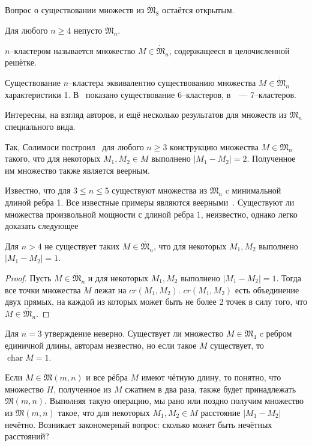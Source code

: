 Вопрос о существовании множеств из $\dot{\mathfrak{M}}_8$
остаётся открытым.

\begin{hypothesis}
	\label{hypot:general_position_nonempty}
	Для любого $n\geq 4$ непусто $\dot{\mathfrak{M}}_n$.
\end{hypothesis}


\begin{definition}
	\cite{noll1989nclusters,kurz2013constructing}
	$n$--кластером называется множество $M\in\dot{\mathfrak{M}}_n$,
	содержащееся в целочисленной решётке.
\end{definition}
Существование $n$--кластера эквивалентно существованию множества $M\in\dot{\mathfrak{M}}_n$
характеристики 1.
В~\cite{noll1989nclusters} показано существование 6--кластеров,
в~\cite{kurz2013constructing}~--- 7--кластеров.


Интересны, на взгляд авторов, и ещё несколько результатов для множеств из $\mathfrak{M}_n$ специального вида.

Так, Солимоси построил~\cite{solymosi2003note} для любого $n\geq 3$ конструкцию множества $M\in\mathfrak{M}_n$
такого, что для некоторых $M_1, M_2 \in M$ выполнено $|M_1 - M_2| = 2$.
Полученное им множество также является веерным.

Известно, что для $3\leq n \leq 5$ существуют множества из $\mathfrak{M}_n$
c минимальной длиной ребра 1.
Все известные примеры являются веерными~\cite{harborth1993upper}.
Существуют ли множества произвольной мощности с длиной ребра 1,
неизвестно, однако легко доказать следующее
\begin{proposition}
	Для $n > 4$ не существует таких $M\in\overline{\mathfrak{M}}_n$,
	что для некоторых $M_1, M_2$ выполнено $|M_1 - M_2| = 1$.
\end{proposition}
\begin{proof}
	Пусть $M\in\overline{\mathfrak{M}}_n$ и для некоторых $M_1, M_2$ выполнено $|M_1 - M_2| = 1$.
	Тогда все точки множества $M$ лежат на $cr(M_1,M_2)$.
	$cr(M_1,M_2)$ есть объединение двух прямых, на каждой из которых может быть не более 2 точек в силу того, что
	$M\in\overline{\mathfrak{M}}_n$.
\end{proof}
Для $n=3$ утверждение неверно.
Существует ли множество $M\in\mathfrak{M}_4$ c ребром единичной длины,
авторам незвестно, но если такое $M$ существует, то $\operatorname{char} M = 1$.


Если $M\in\mathfrak{M}(m,n)$ и все рёбра $M$ имеют чётную длину,
то понятно, что множество $H$, полученное из $M$ сжатием в два раза,
также будет принадлежать $\mathfrak{M}(m,n)$.
Выполняя такую операцию, мы рано или поздно получим множество из $\mathfrak{M}(m,n)$ такое,
что для некоторых $M_1,M_2\in M$ расстояние $|M_1 - M_2|$ нечётно.
Возникает закономерный вопрос: сколько может быть нечётных расстояний?

